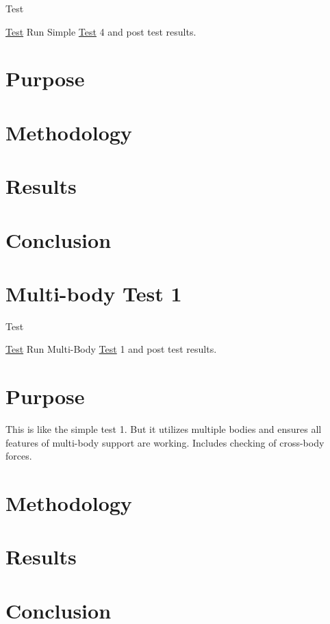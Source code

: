 \begin{DoxyRefDesc}{Test}
\item[\hyperlink{test__test000017}{Test}]Run Simple \hyperlink{class_test}{Test} 4 and post test results.\end{DoxyRefDesc}


\section*{Purpose}

\section*{Methodology}

\section*{Results}

\section*{Conclusion}\hypertarget{MultiBodyTest1}{}\section{Multi-\/body Test 1}\label{MultiBodyTest1}
\begin{DoxyRefDesc}{Test}
\item[\hyperlink{test__test000001}{Test}]Run Multi-\/\-Body \hyperlink{class_test}{Test} 1 and post test results.\end{DoxyRefDesc}


\section*{Purpose}

This is like the simple test 1. But it utilizes multiple bodies and ensures all features of multi-\/body support are working. Includes checking of cross-\/body forces.

\section*{Methodology}

\section*{Results}

\section*{Conclusion}

